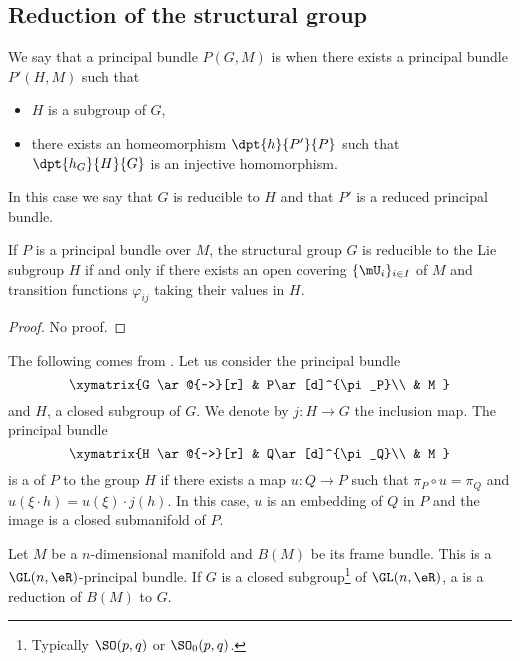 \subsection{Reduction of the structural group}

We say that a principal bundle $P(G,M)$ is  when there exists a principal bundle $P'(H,M)$ such that

\begin{itemize}
	\item $H$ is a subgroup of $G$,
	\item there exists an homeomorphism $\dpt{h}{P'}{P}$ such that $\dpt{h_G}{H}{G}$ is an injective homomorphism.
\end{itemize}

In this case we say that $G$ is reducible to $H$ and that $P'$ is a reduced principal bundle.

\begin{theorem}
	If $P$ is a principal bundle over $M$, the structural group $G$ is reducible to the Lie subgroup $H$ if and only if there exists an open covering $\{ \mU_i \}_{i\in I}$ of $M$ and transition functions $\varphi_{ij}$ taking their values in $H$.
\end{theorem}
\begin{proof}
	No proof.
\end{proof}
The following comes from \cite{Dieu4}. Let us consider the principal bundle
\begin{equation}
	\xymatrix{%
		G \ar@{~>}[r]		&	P\ar[d]^{\pi_P}\\
		&	M
	}
\end{equation}
and $H$, a closed subgroup of $G$. We denote by $j\colon H\to G$ the inclusion map. The principal bundle
\begin{equation}
	\xymatrix{%
		H \ar@{~>}[r]		&	Q\ar[d]^{\pi_Q}\\
		&	M
	}
\end{equation}
is a  of $P$ to the group $H$ if there exists a map $u\colon Q\to P$ such that $\pi_P\circ u=\pi_Q$ and $u(\xi\cdot h)=u(\xi)\cdot j(h)$. In this case, $u$ is an embedding of $Q$ in $P$ and the image is a closed submanifold of $P$.

Let $M$ be a $n$-dimensional manifold and $B(M)$ be its frame bundle. This is a $\GL(n,\eR)$-principal bundle. If $G$ is a closed subgroup\footnote{Typically $\SO(p,q)$ or $\SO_0(p,q)$.} of $\GL(n,\eR)$, a  is a reduction of $B(M)$ to $G$.

